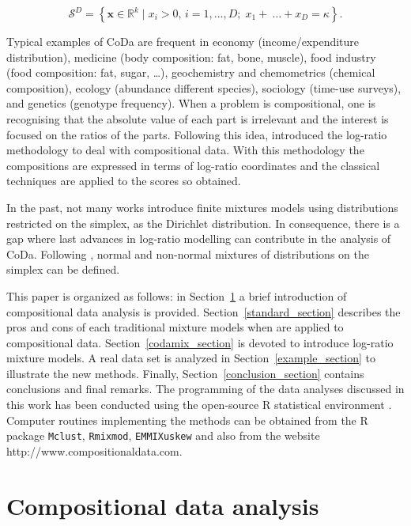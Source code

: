 \documentclass[10pt, a4paper]{article}
\begin{document}
\[
\mathcal{S}^D = \left\{ \textbf{x} \in \mathbb{R}^k \;|\; x_i > 0,\, i=1,\dots, D;\; x_1 + \
\dots + x_D = \kappa \right\}.
\]

Typical examples of CoDa are frequent in economy (income/expenditure distribution), medicine (body composition: fat, bone, muscle), food industry (food composition: fat, sugar, …), geochemistry and chemometrics (chemical composition), ecology (abundance different species), sociology (time-use surveys), and genetics (genotype frequency). 
When a problem is compositional, one is recognising that the absolute value of each part is irrelevant and the interest is focused on the ratios of the parts. Following this idea, \cite{aitchison1986statistical} introduced the log-ratio methodology to deal with compositional data. With this methodology 
the compositions are expressed in terms of log-ratio coordinates and the classical techniques are applied to the scores so obtained.

In the past, not many works \citep[e.g.,][]{albert1982mixtures, bouguila2004unsupervised} introduce finite mixtures models using distributions restricted on the simplex, as the Dirichlet distribution. In consequence, there is a gap where last advances in 
log-ratio modelling can contribute in the analysis of CoDa. Following \cite{mateu2013normal}, normal and non-normal mixtures of distributions on the simplex 
can be defined.

This paper is organized as follows: in Section~\ref{coda_section} a brief introduction of compositional data analysis is provided. Section~\ref{standard_section} describes the pros and cons of each traditional mixture models when are applied to compositional data. Section~\ref{codamix_section} is devoted to introduce log-ratio mixture models. A real data set is analyzed in Section~\ref{example_section} to illustrate the new methods. Finally, Section~\ref{conclusion_section} contains conclusions and final remarks. The programming of the data analyses discussed in this work has been conducted using the open-source R statistical environment \citep{R2013soft}. Computer routines implementing the methods can be obtained from the R package \texttt{Mclust}, \texttt{Rmixmod}, \texttt{EMMIXuskew} and also from the website http://www.compositionaldata.com.






\section{Compositional data analysis}
\label{coda_section}
\end{document}
